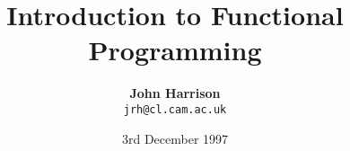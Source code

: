


\title{\Huge \bf Introduction to Functional Programming}

\author{\Large {\bf John Harrison}\\{\tt jrh@cl.cam.ac.uk}}

\date{3rd December 1997}






\newcommand{\nat}{\mbox{$\protect\Bbb N$}}
\newcommand{\num}{\mbox{$\protect\Bbb Z$}}
\newcommand{\rat}{\mbox{$\protect\Bbb Q$}}
\newcommand{\real}{\mbox{$\protect\Bbb R$}}
\newcommand{\complex}{\mbox{$\protect\Bbb C$}}
\newcommand{\xxx}{\mbox{$\protect\Bbb X$}}

\newcommand{\lamb}[1]{\lambda #1.\:}
\newcommand{\eps}[1]{\varepsilon #1.\:}
\newcommand{\all}[1]{\forall #1.\:}
\newcommand{\ex}[1]{\exists #1.\:}
\newcommand{\exu}[1]{\exists! #1.\:}

\newcommand{\True}{\top}
\newcommand{\False}{\bot}
\newcommand{\Not}{\neg}
\newcommand{\And}{\wedge}
\newcommand{\Or}{\vee}
\newcommand{\Imp}{\Rightarrow}
\newcommand{\Iff}{\Leftrightarrow}

\newcommand{\entails}{\vdash}
\newcommand{\proves}{\vdash}

\newcommand{\Ands}{\bigwedge}
\newcommand{\Ors}{\bigvee}

\newcommand{\BQ}{\mbox{$\ulcorner$}}
\newcommand{\BEQ}{\mbox{\raise4pt\hbox{$\ulcorner$}}}
\newcommand{\EQ}{\mbox{$\urcorner$}}
\newcommand{\EEQ}{\mbox{\raise4pt\hbox{$\urcorner$}}}

\newcommand{\QUOTE}[1]{\mbox{$\BQ #1 \EQ$}}

\let\psubset=\subset                    %
\let\subset=\subseteq

\newcommand{\powerset}{\wp}             %

\newcommand{\Union}{\cup}
\newcommand{\Inter}{\cap}
\newcommand{\Unions}{\bigcup}
\newcommand{\Inters}{\bigcap}

\newcommand{\proof}{{\bf \noindent Proof:\ }}
\newcommand{\qed}{Q.E.D.}

\newcommand{\Rule}{\infer}

\newcommand{\restrict}{\upharpoonright} %

\newcommand{\bigsqcap}{\mbox{\Large{$\sqcap$}}}

